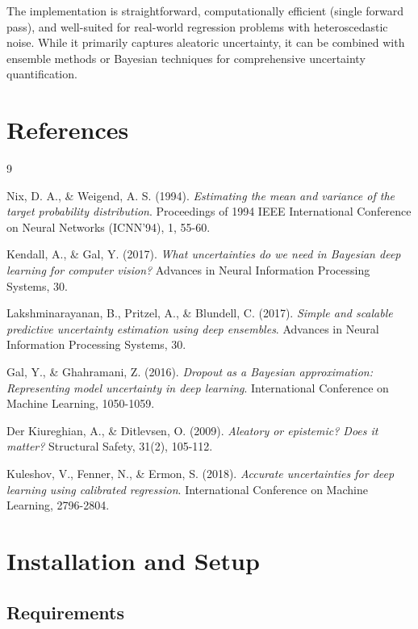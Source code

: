 \documentclass[11pt,a4paper]{article}
\begin{document}
The implementation is straightforward, computationally efficient (single forward pass), and well-suited for real-world regression problems with heteroscedastic noise. While it primarily captures aleatoric uncertainty, it can be combined with ensemble methods or Bayesian techniques for comprehensive uncertainty quantification.

\section{References}

\begin{thebibliography}{9}

Nix, D. A., \& Weigend, A. S. (1994).
\textit{Estimating the mean and variance of the target probability distribution}.
Proceedings of 1994 IEEE International Conference on Neural Networks (ICNN'94), 1, 55-60.

Kendall, A., \& Gal, Y. (2017).
\textit{What uncertainties do we need in Bayesian deep learning for computer vision?}
Advances in Neural Information Processing Systems, 30.

Lakshminarayanan, B., Pritzel, A., \& Blundell, C. (2017).
\textit{Simple and scalable predictive uncertainty estimation using deep ensembles}.
Advances in Neural Information Processing Systems, 30.

Gal, Y., \& Ghahramani, Z. (2016).
\textit{Dropout as a Bayesian approximation: Representing model uncertainty in deep learning}.
International Conference on Machine Learning, 1050-1059.

Der Kiureghian, A., \& Ditlevsen, O. (2009).
\textit{Aleatory or epistemic? Does it matter?}
Structural Safety, 31(2), 105-112.

Kuleshov, V., Fenner, N., \& Ermon, S. (2018).
\textit{Accurate uncertainties for deep learning using calibrated regression}.
International Conference on Machine Learning, 2796-2804.

\end{thebibliography}

\appendix

\section{Installation and Setup}

\subsection{Requirements}
\end{document}
